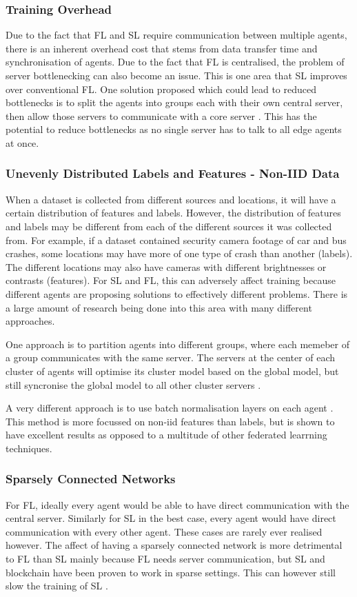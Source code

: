 \subsubsection{Training Overhead}
Due to the fact that FL and SL require communication between multiple agents, there is an inherent overhead cost that stems from data transfer time and synchronisation of agents. Due to the fact that FL is centralised, the problem of server bottlenecking can also become an issue. This is one area that SL improves over conventional FL. One solution proposed which could lead to reduced bottlenecks is to split the agents into groups each with their own central server, then allow those servers to communicate with a core server \cite{multi_center_fed_learning}. This has the potential to reduce bottlenecks as no single server has to talk to all edge agents at once.

\subsubsection{Unevenly Distributed Labels and Features - Non-IID Data}
When a dataset is collected from different sources and locations, it will have a certain distribution of features and labels. However, the distribution of features and labels may be different from each of the different sources it was collected from. For example, if a dataset contained security camera footage of car and bus crashes, some locations may have more of one type of crash than another (labels). The different locations may also have cameras with different brightnesses or contrasts (features). For SL and FL, this can adversely affect training \citeme because different agents are proposing solutions to effectively different problems. There is a large amount of research being done into this area with many different approaches.

One approach is to partition agents into different groups, where each memeber of a group communicates with the same server. The servers at the center of each cluster of agents will optimise its cluster model based on the global model, but still syncronise the global model to all other cluster servers \cite{multi_center_fed_learning}.

A very different approach is to use batch normalisation layers on each agent \cite{fedbn}. This method is more focussed on non-iid features than labels, but is shown to have excellent results as opposed to a multitude of other federated learrning techniques.

\subsubsection{Sparsely Connected Networks}
For FL, ideally every agent would be able to have direct communication with the central server. Similarly for SL in the best case, every agent would have direct communication with every other agent. These cases are rarely ever realised however. The affect of having a sparsely connected network is more detrimental to FL than SL mainly because FL needs server communication, but SL and blockchain have been proven to work in sparse settings. This can however still slow the training of SL \citeme.

